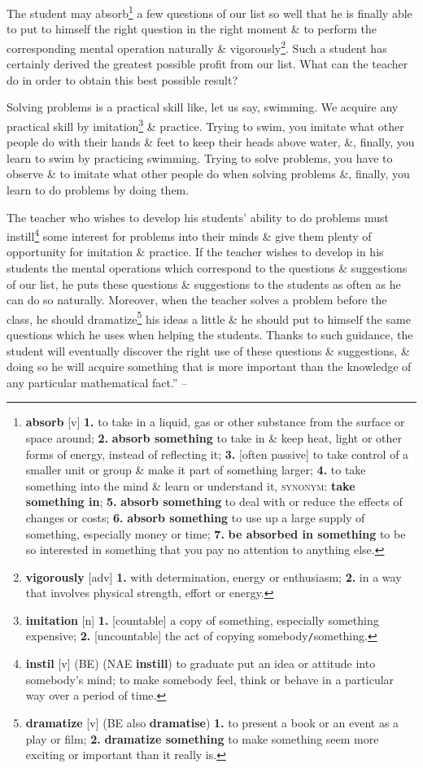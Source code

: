 \documentclass[oneside]{book}
\numberwithin{equation}{section}
\begin{document}
The student may absorb\footnote{\textbf{absorb} [v] \textbf{1.} to take in a liquid, gas or other substance from the surface or space around; \textbf{2.} \textbf{absorb something} to take in \& keep heat, light or other forms of energy, instead of reflecting it; \textbf{3.} [often passive] to take control of a smaller unit or group \& make it part of something larger; \textbf{4.} to take something into the mind \& learn or understand it, \textsc{synonym}: \textbf{take something in}; \textbf{5.} \textbf{absorb something} to deal with or reduce the effects of changes or costs; \textbf{6.} \textbf{absorb something} to use up a large supply of something, especially money or time; \textbf{7.} \textbf{be absorbed in something} to be so interested in something that you pay no attention to anything else.} a few questions of our list so well that he is finally able to put to himself the right question in the right moment \& to perform the corresponding mental operation naturally \& vigorously\footnote{\textbf{vigorously} [adv] \textbf{1.} with determination, energy or enthusiasm; \textbf{2.} in a way that involves physical strength, effort or energy.}. Such a student has certainly derived the greatest possible profit from our list. What can the teacher do in order to obtain this best possible result?

Solving problems is a practical skill like, let us say, swimming. We acquire any practical skill by imitation\footnote{\textbf{imitation} [n] \textbf{1.} [countable] a copy of something, especially something expensive; \textbf{2.} [uncountable] the act of copying somebody\texttt{/}something.} \& practice. Trying to swim, you imitate what other people do with their hands \& feet to keep their heads above water, \&, finally, you learn to swim by practicing swimming. Trying to solve problems, you have to observe \& to imitate what other people do when solving problems \&, finally, you learn to do problems by doing them.

The teacher who wishes to develop his students' ability to do problems must instill\footnote{\textbf{instil} [v] (BE) (NAE \textbf{instill}) to graduate put an idea or attitude into somebody's mind; to make somebody feel, think or behave in a particular way over a period of time.} some interest for problems into their minds \& give them plenty of opportunity for imitation \& practice. If the teacher wishes to develop in his students the mental operations which correspond to the questions \& suggestions of our list, he puts these questions \& suggestions to the students as often as he can do so naturally. Moreover, when the teacher solves a problem before the class, he should dramatize\footnote{\textbf{dramatize} [v] (BE also \textbf{dramatise}) \textbf{1.} to present a book or an event as a play or film; \textbf{2.} \textbf{dramatize something} to make something seem more exciting or important than it really is.} his ideas a little \& he should put to himself the same questions which he uses when helping the students. Thanks to such guidance, the student will eventually discover the right use of these questions \& suggestions, \& doing so he will acquire something that is more important than the knowledge of any particular mathematical fact.'' -- \cite[pp. 3--5]{Polya2014}
\end{document}

